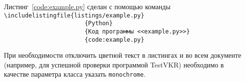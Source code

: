 \newpage
Листинг~\ref{code:example.py} сделан с помощью команды \\
\lstinline$\includelistingfile{listings/example.py}$ \\
\lstinline$                       {Python}$ \\
\lstinline$                       {Код программы <<example.py>>}$ \\
\lstinline$                       {code:example.py}$


При необходимости отключить цветной текст в листингах и во всем документе
(например, для успешной проверки программой TestVKR) необходимо в качестве
параметра класса указать \lstinline$monochrome$.